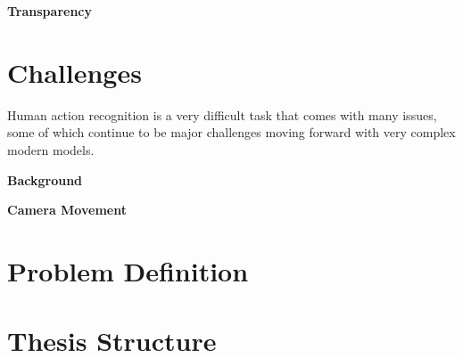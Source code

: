 \textbf{Transparency}

\section{Challenges}

Human action recognition is a very difficult task that comes with many issues, some of which continue to be major challenges moving forward with very complex modern models.

\textbf{Background}

\textbf{Camera Movement}

\section{Problem Definition}

\section{Thesis Structure}